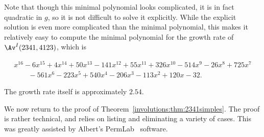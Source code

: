 \documentclass[12pt,twoside]{memoir}
\begin{document}
    
      Note that though this minimal polynomial looks complicated, it is in fact
      quadratic in $g$, so it is not difficult to solve it explicitly. While the
      explicit solution is even more complicated than the minimal polynomial,
      this makes it relatively easy to compute the minimal polynomial for the
      growth rate of $\Av^I(2341,4123)$, which is

      \begin{align*}
        x^{16} - 6x^{15} + 4x^{14} + 50x^{13} - 141x^{12} + 55x^{11} + 326x^{10}
        - 514x^9 - 26x^8 + 725x^7\\
        \qquad - 561x^6 - 223x^5 + 540x^4 - 206x^3 - 113x^2 + 120x - 32.
      \end{align*}

      The growth rate itself is approximately $2.54$.





      We now return to the proof of Theorem~\ref{involutions:thm:2341simples}.
      The proof is rather technical, and relies on listing and eliminating a
      variety of cases. This was greatly assisted by Albert's
      PermLab~\cite{PermLab} software. 
\end{document}
